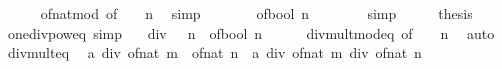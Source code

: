 \begin{isabellebody}
\ \ \ \ \isamarkupfalse%
\ of{\isacharunderscore}{\kern0pt}nat{\isacharunderscore}{\kern0pt}mod\ {\isacharbrackleft}{\kern0pt}of\ {}\ {\isachardoublequoteopen}{}\ {\isacharcircum}{\kern0pt}\ n{\isachardoublequoteclose}{\isacharbrackright}{\kern0pt}\ \isamarkupfalse%
\ simp\isanewline
\ \ \isamarkupfalse%
\ \isamarkupfalse%
\ {\isachardoublequoteopen}{\isasymdots}\ {\isacharequal}{\kern0pt}\ of{\isacharunderscore}{\kern0pt}bool\ {\isacharparenleft}{\kern0pt}n\ {\isachargreater}{\kern0pt}\ {}{\isacharparenright}{\kern0pt}{\isachardoublequoteclose}\isanewline
\ \ \ \ \isamarkupfalse%
\ simp\isanewline
\ \ \isamarkupfalse%
\ \isamarkupfalse%
\ {\isacharquery}{\kern0pt}thesis\ \isacommand{{\isachardot}{\kern0pt}}\isamarkupfalse%
\isanewline
{}\isamarkupfalse%
%
\endisatagproof
{\isafoldproof}%
%
\isadelimproof
\isanewline
%
\endisadelimproof
\isanewline
{}\isamarkupfalse%
\ one{\isacharunderscore}{\kern0pt}div{\isacharunderscore}{\kern0pt}{}{\isacharunderscore}{\kern0pt}pow{\isacharunderscore}{\kern0pt}eq\ {\isacharbrackleft}{\kern0pt}simp{\isacharbrackright}{\kern0pt}{\isacharcolon}{\kern0pt}\isanewline
\ \ {\isachardoublequoteopen}{}\ div\ {\isacharparenleft}{\kern0pt}{}\ {\isacharcircum}{\kern0pt}\ n{\isacharparenright}{\kern0pt}\ {\isacharequal}{\kern0pt}\ of{\isacharunderscore}{\kern0pt}bool\ {\isacharparenleft}{\kern0pt}n\ {\isacharequal}{\kern0pt}\ {}{\isacharparenright}{\kern0pt}{\isachardoublequoteclose}\isanewline
%
\isadelimproof
\ \ %
\endisadelimproof
%
\isatagproof
{}\isamarkupfalse%
\ div{\isacharunderscore}{\kern0pt}mult{\isacharunderscore}{\kern0pt}mod{\isacharunderscore}{\kern0pt}eq\ {\isacharbrackleft}{\kern0pt}of\ {}\ {\isachardoublequoteopen}{}\ {\isacharcircum}{\kern0pt}\ n{\isachardoublequoteclose}{\isacharbrackright}{\kern0pt}\ \isamarkupfalse%
\ auto%
\endisatagproof
{\isafoldproof}%
%
\isadelimproof
\isanewline
%
\endisadelimproof
\isanewline
{}\isamarkupfalse%
\ div{\isacharunderscore}{\kern0pt}mult{}{\isacharunderscore}{\kern0pt}eq{\isacharprime}{\kern0pt}{\isacharcolon}{\kern0pt}\isanewline
\ \ {\isachardoublequoteopen}a\ div\ {\isacharparenleft}{\kern0pt}of{\isacharunderscore}{\kern0pt}nat\ m\ {\isacharasterisk}{\kern0pt}\ of{\isacharunderscore}{\kern0pt}nat\ n{\isacharparenright}{\kern0pt}\ {\isacharequal}{\kern0pt}\ a\ div\ of{\isacharunderscore}{\kern0pt}nat\ m\ div\ of{\isacharunderscore}{\kern0pt}nat\ n{\isachardoublequoteclose}\isanewline

\end{isabellebody}
